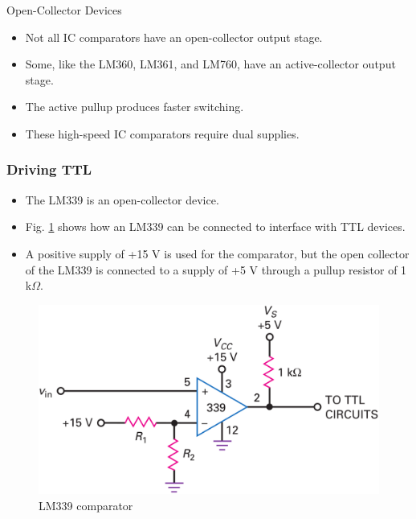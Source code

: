 \documentclass[pdflatex,compress]{beamer}
\begin{document}
\begin{frame}{Open-Collector Devices}
	\begin{itemize}
		\item Not all IC comparators have an open-collector output stage.
		\item Some, like the LM360, LM361, and LM760, have an active-collector output stage.
		\item The active pullup produces faster switching.
		\item These high-speed IC comparators require dual supplies.
	\end{itemize}
\end{frame}

\begin{frame}
	\frametitle{Driving TTL}
	\begin{multicols}{2}
		\begin{itemize}
			\item The LM339 is an open-collector device.
			\item Fig. \ref{fig:2014a} shows how an LM339 can be connected to interface with TTL devices.
			\item A positive supply of +15 V is used for the comparator, but the open collector of the LM339 is connected to a supply of +5 V through a pullup resistor of 1 k$\Omega$.
		\end{itemize}
		\vfill\null
		\begin{figure}
			\centering
			\includegraphics[width=\linewidth]{img/2014a}
			\caption{LM339 comparator}
			\label{fig:2014a}
		\end{figure}
	\end{multicols}
\end{frame}
\end{document}
